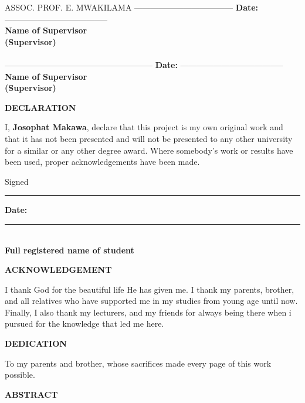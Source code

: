 \documentclass[paper=A4, 12pt, mathscr]{report}
\begin{document}
	\vskip 80pt
	
	ASSOC. PROF. E. MWAKILAMA
	------------------------------------ \hfill {\bf Date:} --------------------------------------\\
	{\bf Name of Supervisor\\(Supervisor)}\\
	
	\ \\ 
	
	------------------------------------------------------ \hfill {\bf Date:} --------------------------------------\\
	{\bf Name of Supervisor\\(Supervisor)}\\
	
	
	\cfoot{\thepage}
	\newpage
	\begin{center}
		{\bf \large \scshape  DECLARATION} \vskip 30pt
	\end{center}
	I, {\bf Josophat Makawa}, declare that this project is my own original work and that 
	it has not been presented and will not be presented to any other university for a similar or 
	any other degree award. Where somebody's work or results have been used, proper acknowledgements have been made.
	
	\vskip 150pt
	Signed\\
	\vskip 7pt
	\rule{8cm}{0.3mm}\hfill {\bf Date:} \rule{5cm}{0.3mm}\\
	{\bf Full registered name of student}\\
	
	\newpage
	\begin{center}
		{\bf \large \scshape ACKNOWLEDGEMENT} \vskip 30pt
	\end{center}
	I thank God for the beautiful life He has given me. I thank my parents, brother, and all relatives who have supported me in my studies from young age until now. Finally, I also thank my lecturers, and my friends for always being there when i pursued for the knowledge that led me here.
	\newpage
	\begin{center}
		{\bf \large \scshape DEDICATION} \vskip 30pt
	\end{center}
	\begin{center}
		To my parents and brother, whose sacrifices made every page of this work possible.
	\end{center}
	\newpage
	\begin{center}
		{\bf \large \scshape  ABSTRACT} \vskip 30pt
	\end{center}
	
\end{document}
